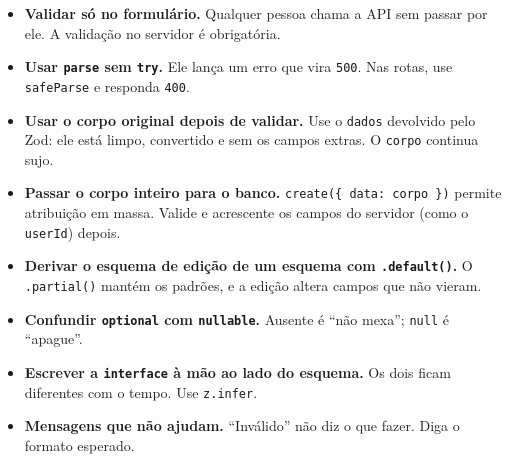 \begin{itemize}
  \item \textbf{Validar só no formulário.} Qualquer pessoa chama a API sem passar por ele. A validação no servidor é obrigatória.
  \item \textbf{Usar \texttt{parse} sem \texttt{try}.} Ele lança um erro que vira \texttt{500}. Nas rotas, use \texttt{safeParse} e responda \texttt{400}.
  \item \textbf{Usar o corpo original depois de validar.} Use o \texttt{dados} devolvido pelo Zod: ele está limpo, convertido e sem os campos extras. O \texttt{corpo} continua sujo.
  \item \textbf{Passar o corpo inteiro para o banco.} \texttt{create(\{ data: corpo \})} permite atribuição em massa. Valide e acrescente os campos do servidor (como o \texttt{userId}) depois.
  \item \textbf{Derivar o esquema de edição de um esquema com \texttt{.default()}.} O \texttt{.partial()} mantém os padrões, e a edição altera campos que não vieram.
  \item \textbf{Confundir \texttt{optional} com \texttt{nullable}.} Ausente é ``não mexa''; \texttt{null} é ``apague''.
  \item \textbf{Escrever a \texttt{interface} à mão ao lado do esquema.} Os dois ficam diferentes com o tempo. Use \texttt{z.infer}.
  \item \textbf{Mensagens que não ajudam.} ``Inválido'' não diz o que fazer. Diga o formato esperado.
\end{itemize}
